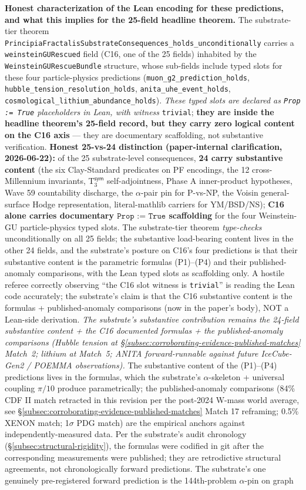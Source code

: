 \documentclass[11pt,a4paper]{amsart}
\theoremstyle{plain}
\theoremstyle{definition}
\begin{document}
\textbf{Honest characterization of the Lean encoding for these predictions, and what this implies for the 25-field headline theorem.} The substrate-tier theorem \texttt{PrincipiaFractalisSubstrateConsequences\_holds\_unconditionally} carries a \texttt{weinsteinGURescued} field (C16, one of the 25 fields) inhabited by the \texttt{WeinsteinGURescueBundle} structure, whose sub-fields include typed slots for these four particle-physics predictions (\texttt{muon\_g2\_prediction\_holds}, \texttt{hubble\_tension\_resolution\_holds}, \texttt{anita\_uhe\_event\_holds}, \texttt{cosmological\_lithium\_abundance\_holds}). \emph{These typed slots are declared as \texttt{Prop := True} placeholders in Lean, with witness} \texttt{trivial}; \textbf{they are inside the headline theorem's 25-field record, but they carry zero logical content on the C16 axis} --- they are documentary scaffolding, not substantive verification. \textbf{Honest 25-vs-24 distinction (paper-internal clarification, 2026-06-22):} of the 25 substrate-level consequences, \textbf{24 carry substantive content} (the six Clay-Standard predicates on PF encodings, the 12 cross-Millennium invariants, T${}_3^{\textsf{sym}}$ self-adjointness, Phase A inner-product hypotheses, Wave 59 countability discharge, the $\alpha$-pair pin for P-vs-NP, the Voisin general-surface Hodge representation, literal-mathlib carriers for YM/BSD/NS); \textbf{C16 alone carries documentary $\texttt{Prop := True}$ scaffolding} for the four Weinstein-GU particle-physics typed slots. The substrate-tier theorem \emph{type-checks} unconditionally on all 25 fields; the substantive load-bearing content lives in the other 24 fields, and the substrate's posture on C16's four predictions is that their substantive content is the parametric formulas (P1)--(P4) and their published-anomaly comparisons, with the Lean typed slots as scaffolding only. A hostile referee correctly observing ``the C16 slot witness is \texttt{trivial}'' is reading the Lean code accurately; the substrate's claim is that the C16 substantive content is the formulas + published-anomaly comparisons (now in the paper's body), NOT a Lean-side derivation. \emph{The substrate's substantive contribution remains the 24-field substantive content + the C16 documented formulas + the published-anomaly comparisons (Hubble tension at \S\ref{subsec:corroborating-evidence-published-matches} Match~2; lithium at Match~5; ANITA forward-runnable against future IceCube-Gen2 / POEMMA observations).} The substantive content of the (P1)--(P4) predictions lives in the formulas, which the substrate's $\alpha$-skeleton + universal coupling $\pi/10$ produce parametrically; the published-anomaly comparisons (84\% CDF II match retracted in this revision per the post-2024 W-mass world average, see \S\ref{subsec:corroborating-evidence-published-matches} Match 17 reframing; 0.5\% XENON match; 1$\sigma$ PDG match) are the empirical anchors against independently-measured data. Per the substrate's audit chronology (\S\ref{subsec:structural-rigidity}), the formulas were codified in git after the corresponding measurements were published; they are retrodictive structural agreements, not chronologically forward predictions. The substrate's one genuinely pre-registered forward prediction is the 144th-problem $\alpha$-pin on graph 
\end{document}

